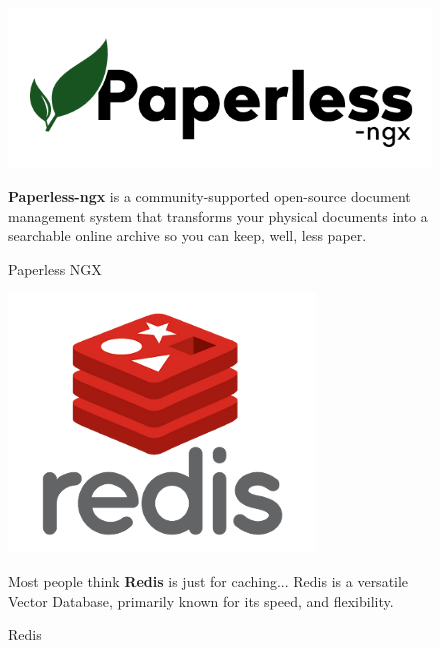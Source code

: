 \begin{figure}[h]
\centering
\begin{minipage}{0.3\textwidth}
    \centering
    \includegraphics[width=\linewidth,frame]{figures/paperless.png}
    \caption{Paperless NGX}
\end{minipage}
\hfill
\begin{minipage}{0.6\textwidth}
 \textbf{Paperless-ngx} is a community-supported open-source document management system that transforms your physical documents into a searchable online archive so you can keep, well, less paper.\cite{samplewebs20}
\end{minipage}
\end{figure}

\begin{figure}[h]
\centering
\begin{minipage}{0.3\textwidth}
    \centering
    \includegraphics[width=\linewidth,frame]{figures/redis.png}
    \caption{Redis}
\end{minipage}
\hfill
\begin{minipage}{0.6\textwidth}
Most people think \textbf{Redis} is just for caching... Redis is a versatile Vector Database, primarily known for its speed, and flexibility.\cite{samplewebs21}
\end{minipage}
\end{figure}


